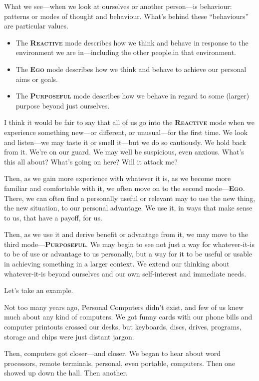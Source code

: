 \documentclass[a5paper]{article}
\begin{document}
What we see---when we look at ourselves or another person---is behaviour: patterns or modes of thought and behaviour.
What's behind these ``behaviours'' are particular values.
\begin{itemize}
  \item The \textbf{\scshape Reactive} mode describes how we think and behave in response to the environment we are in---including the other people.in that environment.
  \item The \textbf{\scshape Ego} mode describes how we think and behave to achieve our personal aims or goals.
  \item The \textbf{\scshape Purposeful} mode describes how we behave in regard to some (larger) purpose beyond just ourselves.
\end{itemize}
I think it would be fair to say that all of us go into the \textbf{\scshape Reactive} mode when we experience something new---or different, or unusual---for the first time.
We look and listen---we may taste it or smell it---but we do so cautiously.
We hold back from it.
We're on our guard.
We may well be suspicious, even anxious.
What's this all about?
What's going on here?
Will it attack me?

Then, as we gain more experience with whatever it is, as we become more familiar and comfortable with it, we often move on to the second mode---\textbf{\scshape Ego}.
There, we can often find a personally useful or relevant may to use the new thing, the new situation, to our personal advantage.
We use it, in ways that make sense to us, that have a payoff, for us.

Then, as we use it and derive benefit or advantage from it, we may move to the third mode---\textbf{\scshape Purposeful}.
We may begin to see not just a way for whatever-it-is to be of use or advantage to us personally, but a way for it to be useful or usable in achieving something in a larger context.
We extend our thinking about whatever-it-is beyond ourselves and our own
 self-interest and immediate needs.

Let's take an example.

Not too many years ago, Personal Computers didn't exist, and few of us knew much about any kind of computers.
We got funny cards with our phone bills and computer printouts crossed our desks, but keyboards, discs, drives, programs, storage and chips were just distant jargon.

Then, computers got closer---and closer.
We began to hear about word processors, remote terminals, personal, even portable, computers.
Then one showed up down the hall.
Then another.
\end{document}
